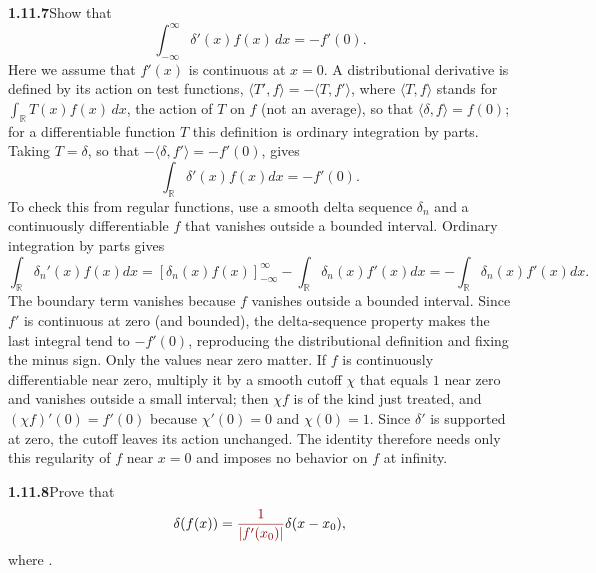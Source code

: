 \par\bigskip
\noindent\textbf{1.11.7}\quad Show that
\[
\int_{-\infty}^{\infty}\delta'(x)f(x)\,dx=-f'(0).
\]
Here we assume that $f'(x)$ is continuous at $x=0$.
\solution
A distributional derivative is defined by its action on test functions,
$\langle T',f\rangle=-\langle T,f'\rangle$, where $\langle T,f\rangle$
stands for $\int_{\mathbb R}T(x)f(x)\,dx$, the action of $T$ on $f$ (not
an average), so that $\langle\delta,f\rangle=f(0)$; for a
differentiable function $T$ this definition is ordinary integration by
parts. Taking $T=\delta$, so that $-\langle\delta,f'\rangle=-f'(0)$,
gives
\[
 \boxed{\int_{\mathbb R}\delta'(x)f(x)dx=-f'(0)}.
\]
To check this from regular functions, use a smooth delta sequence
$\delta_n$ and a continuously differentiable $f$ that vanishes outside
a bounded interval. Ordinary integration by parts gives
\[
 \int_{\mathbb R}\delta_n'(x)f(x)dx
 =[\delta_n(x)f(x)]_{-\infty}^\infty
    -\int_{\mathbb R}\delta_n(x)f'(x)dx
 =-\int_{\mathbb R}\delta_n(x)f'(x)dx.
\]
The boundary term vanishes because $f$ vanishes outside a bounded
interval. Since $f'$ is continuous at zero (and bounded), the
delta-sequence property makes the last integral tend to $-f'(0)$,
reproducing the distributional definition and fixing the minus sign.
Only the values near zero matter. If $f$ is continuously
differentiable near zero, multiply it by a smooth cutoff $\chi$ that
equals $1$ near zero and vanishes outside a small interval; then
$\chi f$ is of the kind just treated, and $(\chi f)'(0)=f'(0)$ because
$\chi'(0)=0$ and $\chi(0)=1$. Since $\delta'$ is supported at zero,
the cutoff leaves its action unchanged. The identity therefore needs
only this regularity of $f$ near $x=0$ and imposes no behavior on $f$
at infinity.


\par\bigskip
\noindent\textbf{1.11.8}\quad Prove that
\[
\delta(f(x))=\erratum{\frac{1}{|f'(x_0)|}}\delta(x-x_{0}),
\]
where .


